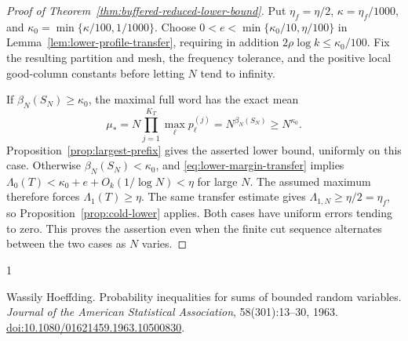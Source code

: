 \documentclass[11pt]{article}
\numberwithin{equation}{section}
\newcommand{\1}{\mathbf 1}
\begin{document}
\begin{proof}[Proof of Theorem~\ref{thm:buffered-reduced-lower-bound}]
Put $\eta_f=\eta/2$, $\kappa=\eta_f/1000$, and
$\kappa_0=\min\{\kappa/100,1/1000\}$. Choose
$0<e<\min\{\kappa_0/10,\eta/100\}$ in
Lemma~\ref{lem:lower-profile-transfer}, requiring in addition
$2\rho\log k\le\kappa_0/100$.
Fix the resulting partition and mesh, the frequency tolerance, and the
positive local good-column constants before letting $N$ tend to infinity.

If $\beta_N(S_N)\ge\kappa_0$, the maximal full word has the exact mean
\[
 \mu_*=N\prod_{j=1}^{K_T}\max_\ell p^{(j)}_\ell
       =N^{\beta_N(S_N)}\ge N^{\kappa_0}.
\]
Proposition~\ref{prop:largest-prefix} gives the asserted lower bound,
uniformly on this case. Otherwise $\beta_N(S_N)<\kappa_0$, and
\eqref{eq:lower-margin-transfer} implies
$\Lambda_0(T)<\kappa_0+e+O_k(1/\log N)<\eta$ for large $N$.
The assumed maximum therefore forces $\Lambda_1(T)\ge\eta$.
The same transfer estimate gives
$\Lambda_{1,N}\ge\eta/2=\eta_f$, so
Proposition~\ref{prop:cold-lower} applies.
Both cases have uniform errors tending to zero. This proves the assertion
even when the finite cut sequence alternates between the two cases as $N$
varies.
\end{proof}

\begin{thebibliography}{1}

Wassily Hoeffding.
\newblock Probability inequalities for sums of bounded random variables.
\newblock \emph{Journal of the American Statistical Association},
  58(301):13--30, 1963.
\newblock
  \href{https://doi.org/10.1080/01621459.1963.10500830}
  {doi:10.1080/01621459.1963.10500830}.

\end{thebibliography}
\end{document}
